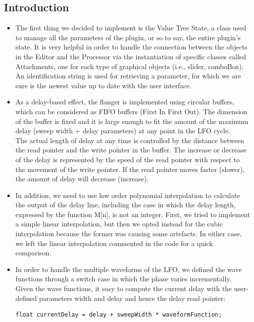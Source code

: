 \documentclass[a4paper,12pt]{report}
\begin{document}
\subsection{Introduction}
\begin{itemize}
\item[\textasteriskcentered]The first thing we decided to implement is the Value Tree State, a class used to manage all the parameters of the plugin, or so to say, the entire plugin’s state. It is very helpful in order to handle the connection between the objects in the Editor and the Processor via the instantiation of specific classes called Attachments, one for each type of graphical objects (i.e., slider, comboBox). An identification string is used for retrieving a parameter, for which we are sure is the newest value up to date with the user interface.  
\item[\textasteriskcentered] As a delay-based effect, the flanger is implemented using circular buffers, which can be considered as FIFO buffers (First In First Out). The dimension of the buffer is fixed and it is large enough to fit the amount of the maximum delay (sweep width + delay parameters) at any point in the LFO cycle.
\\The actual length of delay at any time is controlled by the distance between the read pointer and the write pointer in the buffer. The increase or decrease of the delay is represented by the speed of the read pointer with respect to the movement of the write pointer. If the read pointer moves faster (slower), the amount of delay will decrease (increase).
\item[\textasteriskcentered] In addition, we need to use low order polynomial interpolation to calculate the output of the delay line, including the case in which the delay length, expressed by the function M[n], is not an integer. First, we tried to implement a simple linear interpolation, but then we opted instead for the cubic interpolation because the former was causing some artefacts. In either case, we left the linear interpolation commented in the code for a quick comparison. 
\item[\textasteriskcentered] In order to handle the multiple waveforms of the LFO, we defined the wave functions through a switch case in which the phase varies incrementally. Given the wave functions, it easy to compute the current delay with the user-defined parameters width and delay and hence the delay read pointer:
\begin{verbatim}
float currentDelay = delay + sweepWidth * waveformFunction;
\end{verbatim}
\end{itemize}
\end{document}
